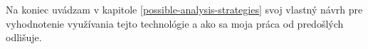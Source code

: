 Na koniec uvádzam v kapitole 
\ref{possible-analysis-strategies} svoj vlastný návrh pre vyhodnotenie využívania tejto technológie a ako sa moja práca od predošlých odlišuje. 

